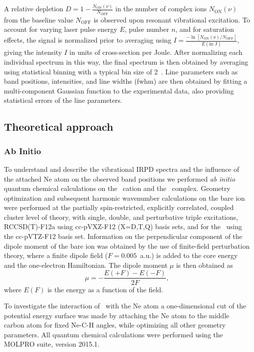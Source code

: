 A relative depletion $D=1-\frac{N_\mathrm{ON}(\nu)}{N_\mathrm{OFF}}$ in the number of complex ions $N_\mathrm{ON}(\nu)$ from the baseline value $N_\mathrm{OFF}$ is observed upon resonant vibrational excitation. To account for varying laser pulse energy $E$, pulse number $n$, and for saturation effects, the signal is normalized prior to averaging using $I=\frac{-\ln[N_\mathrm{ON}(\nu)/N_\mathrm{OFF}]}{E(\text{in J})}$, giving the intensity $I$ in units of cross-section per Joule. After normalizing each individual spectrum in this way, the final spectrum is then obtained by averaging using statistical binning with a typical bin size of 2~\wn. Line parameters such as band positions, intensities, and line widths (fwhm) are then obtained by fitting a multi-component Gaussian function to the experimental data, also providing statistical errors of the line parameters.

\subsection{Theoretical approach}

\subsubsection{Ab Initio}
To understand and describe the vibrational IRPD spectra and the influence of the attached Ne atom on the observed band positions we performed \emph{ab initio} quantum chemical calculations on the \ion\ cation and the \neion\ complex. 
Geometry optimization and subsequent harmonic wavenumber calculations on the bare ion were performed at the partially spin-restricted, explicitly correlated, coupled cluster level of theory, with single, double, and perturbative triple excitations, RCCSD(T)-F12a \cite{Kong2012ExplicitlyStructure} using cc-pVXZ-F12 (X=D,T,Q) \cite{Peterson2008SystematicallyIN} basis sets, and for the \neion\ using the cc-pVTZ-F12 basis set. 
Information on the perpendicular component of the dipole moment of the bare ion was obtained by the use of finite-field perturbation theory, where a finite dipole field ($F=0.005$~a.u.) is added to the core energy and the one-electron Hamiltonian. The dipole moment $\mu$ is then obtained as
\begin{equation}
\label{eq:dipole}
    \mu=-\frac{E(+F) - E(-F)}{2F},
\end{equation}
where $E(F)$ is the energy as a function of the field.

To investigate the interaction of \ion\ with the Ne atom a one-dimensional cut of the potential energy surface was made by attaching the Ne atom to the middle carbon atom for fixed Ne-C-H angles, while optimizing all other geometry parameters. 
All quantum chemical calculations were performed using the MOLPRO suite, version 2015.1.\cite{Werner2020ThePackage}

